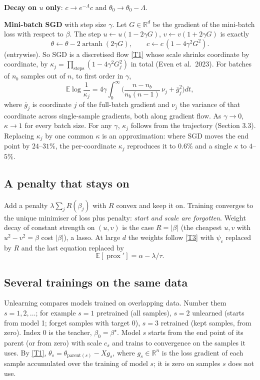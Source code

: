 \documentclass[10pt]{article}
\newcommand{\bs}{\beta^\star}\newcommand{\E}{\mathbb E}\newcommand{\asinh}{\operatorname{arcsinh}}\newcommand{\prox}{\operatorname{prox}}
\begin{document}
\textbf{Decay on $u$ only}: $c\to e^{-\Lambda}c$ and $\theta_0\to\theta_0-\Lambda$.

\textbf{Mini-batch SGD} with step size $\gamma$. Let $G\in\mathbb R^d$ be the gradient of the mini-batch loss with respect to $\beta$. The step $u\leftarrow u(1-2\gamma G)$, $v\leftarrow v(1+2\gamma G)$ is exactly
\begin{equation}\label{sgd}
\theta\leftarrow\theta-2\operatorname{artanh}(2\gamma G),\qquad c\leftarrow c\,(1-4\gamma^2G^2).
\end{equation}
(entrywise). So SGD is a discretised flow \eqref{T1} whose scale shrinks coordinate by coordinate, by $\kappa_j=\prod_{\text{steps}}(1-4\gamma^2G_j^2)$ in total (Even et al.\ 2023). For batches of $n_b$ samples out of $n$, to first order in $\gamma$,
\begin{equation}
\E\log\frac1{\kappa_j}=4\gamma\int_0^\infty\!\Big(\frac{n-n_b}{n_b(n-1)}\,\nu_j+\bar g_j^2\Big)dt ,
\end{equation}
where $\bar g_j$ is coordinate $j$ of the full-batch gradient and $\nu_j$ the variance of that coordinate across single-sample gradients, both along gradient flow. As $\gamma\to0$, $\kappa\to1$ for every batch size. For any $\gamma$, $\kappa_j$ follows from the trajectory (Section 3.3). Replacing $\kappa_j$ by one common $\kappa$ is an approximation: where SGD moves the end point by $24$--$31\%$, the per-coordinate $\kappa_j$ reproduces it to $0.6\%$ and a single $\kappa$ to $4$--$5\%$.

\subsection{A penalty that stays on}
Add a penalty $\lambda\sum_jR(\beta_j)$ with $R$ convex and keep it on. Training converges to the unique minimiser of loss plus penalty: \emph{start and scale are forgotten}. Weight decay of constant strength on $(u,v)$ is the case $R=|\beta|$ (the cheapest $u,v$ with $u^2-v^2=\beta$ cost $|\beta|$), a lasso. At large $d$ the weights follow \eqref{T3} with $\psi_c$ replaced by $R$ and the last equation replaced by
\begin{equation}\label{reg}
\E[\prox{}']=\alpha-\lambda/\tau .
\end{equation}

\subsection{Several trainings on the same data}\label{multi}
Unlearning compares models trained on overlapping data. Number them $s=1,2,\dots$; for example $s=1$ pretrained (all samples), $s=2$ unlearned (starts from model 1; forget samples with target $0$), $s=3$ retrained (kept samples, from zero). Index $0$ is the teacher, $\beta_0=\bs$. Model $s$ starts from the end point of its parent (or from zero) with scale $c_s$ and trains to convergence on the samples it uses. By \eqref{T1}, $\theta_s=\theta_{\text{parent}(s)}-Xg_s$, where $g_s\in\mathbb R^n$ is the loss gradient of each sample accumulated over the training of model $s$; it is zero on samples $s$ does not use.
\end{document}
